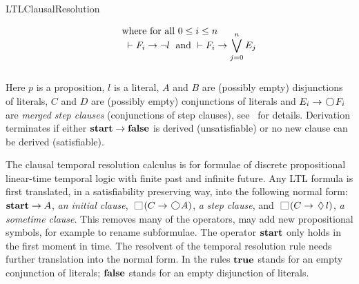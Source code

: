 \begin{entry}{LTLClausalResolution}
\begin{calculus}
\[\begin{array}{c}
\begin{array}[b]{ll}
& \quad
\begin{array}{l}
\text{where for all } 0 \leq i \leq n \\[-5pt]
\mbox{}\;\vdash F_i \rightarrow \neg l \; \text{ and }
\vdash F_i \rightarrow \displaystyle \bigvee_{j=0}^n E_j
\vspace*{0.9em}
\end{array}
\end{array}
\end{array}
\]

\vspace*{-1em}
Here $p$ is a proposition, $l$ is a literal, $A$ and $B$ are (possibly empty) disjunctions of literals,
$C$ and $D$ are (possibly empty) conjunctions of literals and $E_i\rightarrow\Next F_i$  are \emph{merged step clauses}
(conjunctions of step clauses), see~\cite{FDP01} for details.
Derivation terminates if either ${\bf start}\rightarrow{\bf false}$ is derived (unsatisfiable) or no new clause can be derived (satisfiable).  
\end{calculus}


 \begin{clarifications}
The clausal temporal resolution calculus is for formulae of discrete propositional
linear-time temporal logic with finite past and infinite future.
Any LTL formula is first translated, in a satisfiability preserving way, into the
following  normal form: 
${\bf start} \rightarrow A$, {\em an initial clause},
$ \Always (C \rightarrow  \Next A)$, {\em a step clause}, and
$\Always  (C   \rightarrow  \sometime l)$, {\em a sometime clause}.
%
This removes many of the operators, may add new propositional 
symbols, for example to rename subformulae.
%
The operator ${\bf start}$ only holds in the first moment in time. 
%
The resolvent of the temporal resolution rule needs further translation into
the normal form. 
%
In the rules ${\bf true}$ stands for an empty conjunction of literals; ${\bf false}$
stands for an empty disjunction of literals.
 \end{clarifications}


\end{entry}
